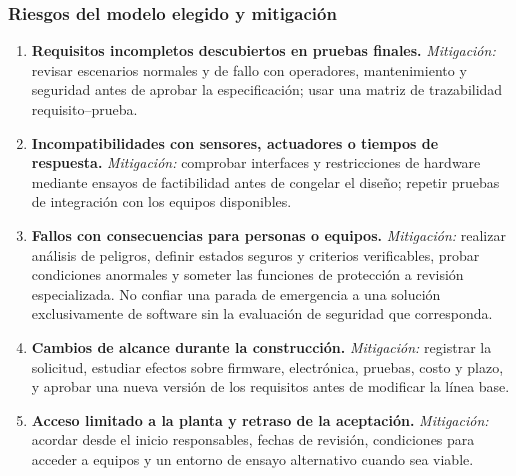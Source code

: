 \subsubsection{Riesgos del modelo elegido y mitigación}
\begin{enumerate}
  \item \textbf{Requisitos incompletos descubiertos en pruebas finales.}
  \emph{Mitigación:} revisar escenarios normales y de fallo con operadores,
  mantenimiento y seguridad antes de aprobar la especificación; usar una
  matriz de trazabilidad requisito--prueba.

  \item \textbf{Incompatibilidades con sensores, actuadores o tiempos de
  respuesta.} \emph{Mitigación:} comprobar interfaces y restricciones de
  hardware mediante ensayos de factibilidad antes de congelar el diseño;
  repetir pruebas de integración con los equipos disponibles.

  \item \textbf{Fallos con consecuencias para personas o equipos.}
  \emph{Mitigación:} realizar análisis de peligros, definir estados seguros
  y criterios verificables, probar condiciones anormales y someter las
  funciones de protección a revisión especializada. No confiar una
  parada de emergencia a una solución exclusivamente de software sin la
  evaluación de seguridad que corresponda.

  \item \textbf{Cambios de alcance durante la construcción.}
  \emph{Mitigación:} registrar la solicitud, estudiar efectos sobre
  firmware, electrónica, pruebas, costo y plazo, y aprobar una nueva
  versión de los requisitos antes de modificar la línea base.

  \item \textbf{Acceso limitado a la planta y retraso de la aceptación.}
  \emph{Mitigación:} acordar desde el inicio responsables, fechas de
  revisión, condiciones para acceder a equipos y un entorno de ensayo
  alternativo cuando sea viable.
\end{enumerate}
